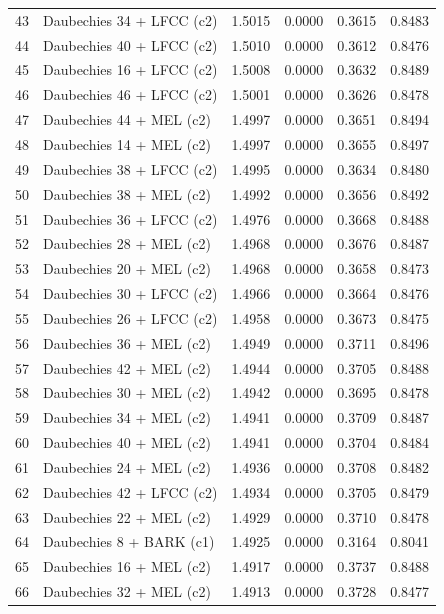 \begin{longtable}{@{}rlrrrr@{}}
43 & Daubechies 34 + LFCC (c2) & 1.5015 & 0.0000 & 0.3615 & 0.8483 \\
44 & Daubechies 40 + LFCC (c2) & 1.5010 & 0.0000 & 0.3612 & 0.8476 \\
45 & Daubechies 16 + LFCC (c2) & 1.5008 & 0.0000 & 0.3632 & 0.8489 \\
46 & Daubechies 46 + LFCC (c2) & 1.5001 & 0.0000 & 0.3626 & 0.8478 \\
47 & Daubechies 44 + MEL (c2) & 1.4997 & 0.0000 & 0.3651 & 0.8494 \\
48 & Daubechies 14 + MEL (c2) & 1.4997 & 0.0000 & 0.3655 & 0.8497 \\
49 & Daubechies 38 + LFCC (c2) & 1.4995 & 0.0000 & 0.3634 & 0.8480 \\
50 & Daubechies 38 + MEL (c2) & 1.4992 & 0.0000 & 0.3656 & 0.8492 \\
51 & Daubechies 36 + LFCC (c2) & 1.4976 & 0.0000 & 0.3668 & 0.8488 \\
52 & Daubechies 28 + MEL (c2) & 1.4968 & 0.0000 & 0.3676 & 0.8487 \\
53 & Daubechies 20 + MEL (c2) & 1.4968 & 0.0000 & 0.3658 & 0.8473 \\
54 & Daubechies 30 + LFCC (c2) & 1.4966 & 0.0000 & 0.3664 & 0.8476 \\
55 & Daubechies 26 + LFCC (c2) & 1.4958 & 0.0000 & 0.3673 & 0.8475 \\
56 & Daubechies 36 + MEL (c2) & 1.4949 & 0.0000 & 0.3711 & 0.8496 \\
57 & Daubechies 42 + MEL (c2) & 1.4944 & 0.0000 & 0.3705 & 0.8488 \\
58 & Daubechies 30 + MEL (c2) & 1.4942 & 0.0000 & 0.3695 & 0.8478 \\
59 & Daubechies 34 + MEL (c2) & 1.4941 & 0.0000 & 0.3709 & 0.8487 \\
60 & Daubechies 40 + MEL (c2) & 1.4941 & 0.0000 & 0.3704 & 0.8484 \\
61 & Daubechies 24 + MEL (c2) & 1.4936 & 0.0000 & 0.3708 & 0.8482 \\
62 & Daubechies 42 + LFCC (c2) & 1.4934 & 0.0000 & 0.3705 & 0.8479 \\
63 & Daubechies 22 + MEL (c2) & 1.4929 & 0.0000 & 0.3710 & 0.8478 \\
64 & Daubechies 8 + BARK (c1) & 1.4925 & 0.0000 & 0.3164 & 0.8041 \\
65 & Daubechies 16 + MEL (c2) & 1.4917 & 0.0000 & 0.3737 & 0.8488 \\
66 & Daubechies 32 + MEL (c2) & 1.4913 & 0.0000 & 0.3728 & 0.8477 \\

\end{longtable}
